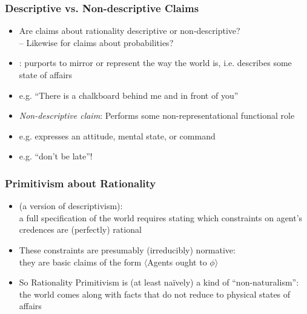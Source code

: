 \begin{frame}
\frametitle{Descriptive vs. Non-descriptive Claims}

\begin{itemize}[<+->]

\item Are claims about rationality descriptive or non-descriptive? \\ -- Likewise for claims about probabilities? 

\item {}: purports to mirror or represent the way the world is, i.e. describes some state of affairs

\item[] e.g. ``There is a chalkboard behind me and in front of you''

\item \emph{Non-descriptive claim}: Performs some non-representational functional role

\item[] e.g. expresses an attitude, mental state, or command

\item[] e.g. ``don't be late''! 

\end{itemize}
\end{frame}

\begin{frame}
\frametitle{Primitivism about Rationality}

\begin{itemize}[<+->]

\item {} (a version of descriptivism): \\ a full specification of the world requires stating which constraints on agent's credences are (perfectly) rational

\item These constraints are presumably (irreducibly) \textcolor{OGlyallpink}{normative}: \\ they are basic claims of the form $\langle$Agents \textcolor{OGlyallpink}{ought} to $\phi$$\rangle$

\item So Rationality Primitivism is (at least  na\"ively) a kind of ``non-naturalism'': the world comes along with facts that do not reduce to physical states of affairs 

\end{itemize}
\end{frame}


